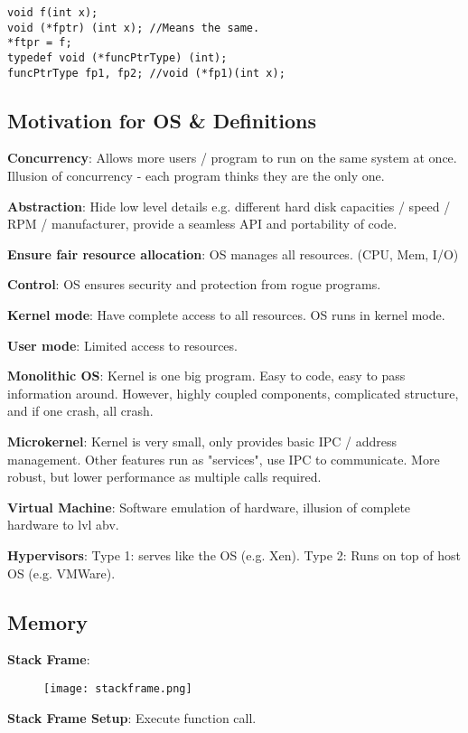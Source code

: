 \documentclass[a4paper,landscape]{article}
\newcommand{\rntopic}[1]{\vspace{-1.5em}\subsection*{#1}\vspace{-0.5em}}
\newcommand{\rnname}[1]{\textbf{#1}}
\begin{document}
\begin{multicols*}{4}
\begin{flatitemize}
\begin{lstlisting}
void f(int x); 
void (*fptr) (int x); //Means the same.
*ftpr = f;
typedef void (*funcPtrType) (int);
funcPtrType fp1, fp2; //void (*fp1)(int x);
\end{lstlisting}
\end{flatitemize}
\rntopic{Motivation for OS \& Definitions}
\vspace{0.3cm}
\begin{flatitemize}
\item \rnname{Concurrency}: Allows more users / program to run on the same system at once. Illusion of concurrency - each program thinks they are the only one. 
\item \rnname{Abstraction}: Hide low level details e.g. different hard disk capacities / speed / RPM / manufacturer, provide a seamless API and portability of code.
\item \rnname{Ensure fair resource allocation}: OS manages all resources. (CPU, Mem, I/O)
\item \rnname{Control}: OS ensures security and protection from rogue programs.
\item \rnname{Kernel mode}: Have complete access to all resources. OS runs in kernel mode.
\item \rnname{User mode}: Limited access to resources. 
\item \rnname{Monolithic OS}: Kernel is one big program. Easy to code, easy to pass information around. However, highly coupled components, complicated structure, and if one crash, all crash.
\item \rnname{Microkernel}: Kernel is very small, only provides basic IPC / address management. Other features run as "services", use IPC to communicate. More robust, but lower performance as multiple calls required.
\item \rnname{Virtual Machine}: Software emulation of hardware, illusion of complete hardware to lvl abv.
\item \rnname{Hypervisors}: Type 1: serves like the OS (e.g. Xen). Type 2: Runs on top of host OS (e.g. VMWare).
\end{flatitemize}
\vspace{0.2cm}
\rntopic{Memory}
\vspace{0.2cm}
\begin{flatitemize}
\item \rnname{Stack Frame}:
    \begin{figure}[H]
      \texttt{[image: stackframe.png]}
    \end{figure}
\item \rnname{Stack Frame Setup}: Execute function call. \\

\end{flatitemize}
\end{multicols*}
\end{document}
